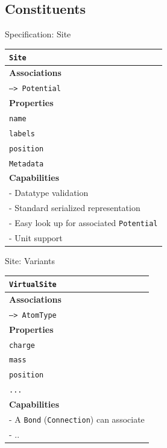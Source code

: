\documentclass[xcolor=table]{beamer}
\begin{document}
\subsection{Constituents}
\begin{frame}{Specification: Site}
\begin{table}[ht]
    \centering
    \begin{tabular}{|l|}
         \hline
         \rowcolor{gray!50}
         \texttt{Site}  \\
         \hline
         \textbf{Associations} \\
         \hline
         \texttt{--> Potential}\\
         \textbf{Properties}\\
         \hline
         \texttt{name} \\
         \texttt{labels} \\
         \texttt{position}\\
         \texttt{Metadata}\\
         \hline
         \textbf{Capabilities}\\
         \hline
         - Datatype validation \\
         - Standard serialized representation \\
         - Easy look up for associated \texttt{Potential} \\
         - Unit support \\
        \hline
    \end{tabular}
    \label{tab:SiteSpec}
\end{table}

\end{frame}

\begin{frame}{Site: Variants}
\begin{table}[ht]
    \centering
    \begin{tabular}{|l|}
         \hline
         \rowcolor{gray!50}
         \texttt{VirtualSite}  \\
         \hline
         \textbf{Associations} \\
         \hline
         \texttt{--> AtomType}\\
         \textbf{Properties}\\
         \hline
         \texttt{charge} \\
         \texttt{mass} \\
         \texttt{position}\\
         \texttt{...}\\
         \hline
         \textbf{Capabilities}\\
         \hline
         - A \texttt{Bond} (\texttt{Connection}) can associate\\
         - ..\\
        \hline
    \end{tabular}

\end{table}
\end{frame}
\end{document}
